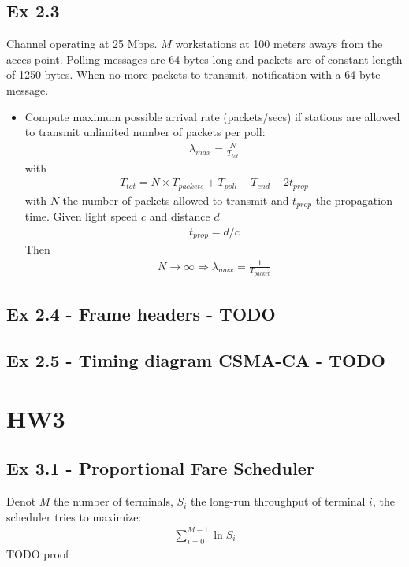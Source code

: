 \subsection*{Ex 2.3}
Channel operating at 25 Mbps. $M$ workstations at 100 meters aways from the acces point. Polling messages are 64 bytes long and packets are of constant length of 1250 bytes. When no more packets to transmit, notification with a 64-byte message.
\begin{itemize}
	\item Compute maximum possible arrival rate (packets/secs) if stations are allowed to transmit unlimited number of packets per poll:
	\begin{align*}
		\lambda_{max} = \frac{N}{T_{tot}}
	\end{align*}
	with
	\begin{align*}
		T_{tot} = N \times T_{packets} + T_{poll} + T_{end} + 2 t_{prop}
	\end{align*}
	with $N$ the number of packets allowed to transmit and $t_{prop}$ the propagation time. Given light speed $c$ and distance $d$
	\begin{align*}
		t_{prop} = d / c
	\end{align*}
	Then
	\begin{align*}
		N \rightarrow \infty \Rightarrow \lambda_{max} = \frac{1}{T_{packet}}
	\end{align*}
\end{itemize}

\subsection*{Ex 2.4 - Frame headers - TODO}

\subsection*{Ex 2.5 - Timing diagram CSMA-CA - TODO}



\section*{HW3}

\begin{notImportant}
\subsection*{Ex 3.1 - Proportional Fare Scheduler}
Denot $M$ the number of terminals, $S_i$ the long-run throughput of terminal $i$, the scheduler tries to maximize:
\begin{align*}
	\sum_{i=0}^{M-1} \ln S_i
\end{align*}
TODO proof
\end{notImportant}

